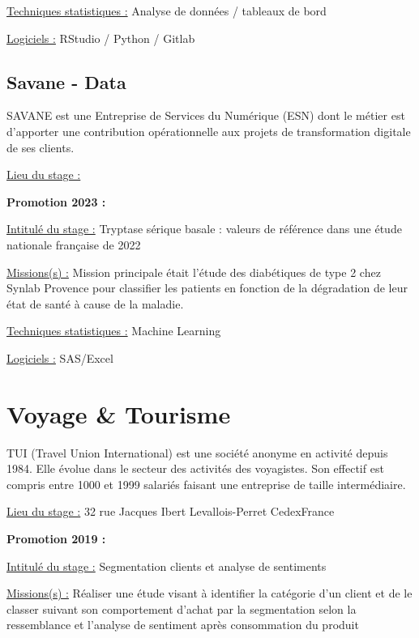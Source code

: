 \documentclass[
  letterpaper,
  DIV=11,
  numbers=noendperiod]{scrreprt}
\begin{document}
\uline{Techniques statistiques :} Analyse de données / tableaux de bord

\uline{Logiciels :} RStudio / Python / Gitlab

\hypertarget{savane---data}{%
\section{\texorpdfstring{\textbf{Savane -
Data}}{Savane - Data}}\label{savane---data}}

SAVANE est une Entreprise de Services du Numérique (ESN) dont le métier
est d'apporter une contribution opérationnelle aux projets de
transformation digitale de ses clients.

\uline{Lieu du stage :}

\textbf{Promotion 2023 :}

\uline{Intitulé du stage :} Tryptase sérique basale : valeurs de
référence dans une étude nationale française de 2022

\uline{Missions(s) :} Mission principale était l'étude des diabétiques
de type 2 chez Synlab Provence pour classifier les patients en fonction
de la dégradation de leur état de santé à cause de la maladie.

\uline{Techniques statistiques :} Machine Learning

\uline{Logiciels :} SAS/Excel


\hypertarget{voyage-tourisme}{%
\chapter{Voyage \& Tourisme}\label{voyage-tourisme}}

TUI (Travel Union International) est une société anonyme en activité
depuis 1984. Elle évolue dans le secteur des activités des voyagistes.
Son effectif est compris entre 1000 et 1999 salariés faisant une
entreprise de taille intermédiaire.

\uline{Lieu du stage :} 32 rue Jacques Ibert
Levallois-Perret Cedex\textbar France

\textbf{Promotion 2019 :}

\uline{Intitulé du stage :} Segmentation clients et analyse de
sentiments

\uline{Missions(s) :} Réaliser une étude visant à identifier la
catégorie d'un client et de le classer suivant son comportement d'achat
par la segmentation selon la ressemblance et l'analyse de sentiment
après consommation du produit
\end{document}
